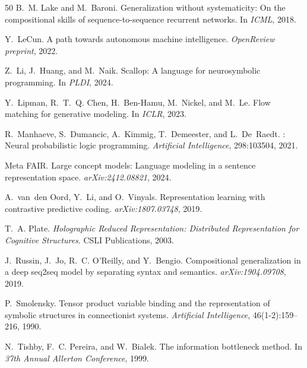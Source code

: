 \documentclass{article}
\begin{document}
\begin{thebibliography}{50}
B.~M. Lake and M.~Baroni.
\newblock Generalization without systematicity: On the compositional skills of
  sequence-to-sequence recurrent networks.
\newblock In \emph{ICML}, 2018.

Y.~LeCun.
\newblock A path towards autonomous machine intelligence.
\newblock \emph{OpenReview preprint}, 2022.

Z.~Li, J.~Huang, and M.~Naik.
\newblock Scallop: A language for neurosymbolic programming.
\newblock In \emph{PLDI}, 2024.

Y.~Lipman, R.~T.~Q. Chen, H.~Ben-Hamu, M.~Nickel, and M.~Le.
\newblock Flow matching for generative modeling.
\newblock In \emph{ICLR}, 2023.

R.~Manhaeve, S.~Dumancic, A.~Kimmig, T.~Demeester, and L.~De~Raedt.
: Neural probabilistic logic programming.
\newblock \emph{Artificial Intelligence}, 298:103504, 2021.

{Meta FAIR}.
\newblock Large concept models: Language modeling in a sentence representation
  space.
\newblock \emph{arXiv:2412.08821}, 2024.

A.~van~den Oord, Y.~Li, and O.~Vinyals.
\newblock Representation learning with contrastive predictive coding.
\newblock \emph{arXiv:1807.03748}, 2019.

T.~A. Plate.
\newblock \emph{Holographic Reduced Representation: Distributed Representation
  for Cognitive Structures}.
\newblock CSLI Publications, 2003.

J.~Russin, J.~Jo, R.~C. O'Reilly, and Y.~Bengio.
\newblock Compositional generalization in a deep seq2seq model by separating
  syntax and semantics.
\newblock \emph{arXiv:1904.09708}, 2019.

P.~Smolensky.
\newblock Tensor product variable binding and the representation of symbolic
  structures in connectionist systems.
\newblock \emph{Artificial Intelligence}, 46(1-2):159--216, 1990.

N.~Tishby, F.~C. Pereira, and W.~Bialek.
\newblock The information bottleneck method.
\newblock In \emph{37th Annual Allerton Conference}, 1999.


\end{thebibliography}
\end{document}
